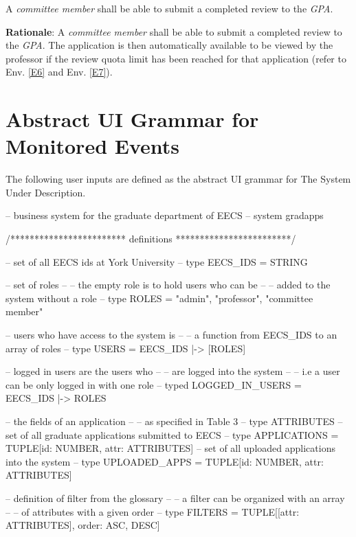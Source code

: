 \documentclass[fontsize=12pt,paper=letter,twoside]{scrartcl}
\begin{document}
\rdescription
{A \emph{committee member} shall be able to submit a completed review to the \emph{GPA}.\\}
{}
\label{R28}

\smallskip
\noindent \textbf{Rationale}: A \emph{committee member} shall be able to submit a completed review to the \emph{GPA}. The application is then automatically available to be viewed by the professor if the review quota limit has been reached for that application (refer to Env. \ref{E6} and Env. \ref{E7}).


\newpage
\section{Abstract UI Grammar for Monitored Events} \label{sec:ui_grammar}

The following user inputs are defined as the abstract UI grammar for The System Under Description.\\

\begin{code}
-- business system for the graduate department of EECS --
system gradapps

/************************ definitions ************************/

-- set of all EECS ids at York University --
type EECS_IDS = STRING

-- set of roles --
-- the empty role is to hold users who can be --
-- added to the system without a role --
type ROLES = {"admin", "professor", "committee member"}

-- users who have access to the system is --
-- a function from EECS_IDS to an array of roles --
type USERS = EECS_IDS |-> [ROLES]

-- logged in users are the users who --
-- are logged into the system --
-- i.e a user can be only logged in with one role --
typed LOGGED_IN_USERS = EECS_IDS |-> ROLES

-- the fields of an application -- 
-- as specified in Table 3 -- 
type ATTRIBUTES
-- set of all graduate applications submitted to EECS --
type APPLICATIONS = TUPLE[id: NUMBER, attr: ATTRIBUTES]
-- set of all uploaded applications into the system --
type UPLOADED_APPS = TUPLE[id: NUMBER, attr: ATTRIBUTES]

-- definition of filter from the glossary --
-- a filter can be organized with an array --
-- of attributes with a given order --
type FILTERS = TUPLE[[attr: ATTRIBUTES], order: {ASC, DESC}]
\end{code}
\end{document}
